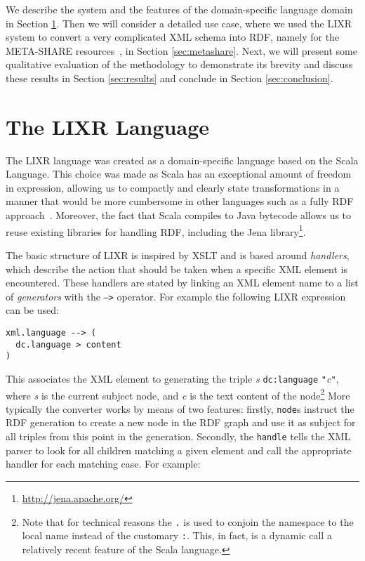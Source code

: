 \documentclass{acm_proc_article-sp}
\begin{document}
We describe the system and the features of the domain-specific language domain in Section
\ref{sec:dsl}. Then we will consider a detailed use case, where we used the LIXR
system to convert a very complicated XML schema into RDF, namely for the META-SHARE
resources~\cite{mccrae2015ontology,piperidis2012meta}, in Section \ref{sec:metashare}. Next, we will present some qualitative evaluation
of the methodology to demonstrate its brevity and discuss these results in Section
\ref{sec:results} and conclude in Section \ref{sec:conclusion}.

\section{The LIXR Language}
\label{sec:dsl}

The LIXR language was created as a domain-specific language based on the Scala
Language. This choice was made as Scala has an exceptional amount of freedom in
expression, allowing us to compactly and clearly state transformations in a manner
that would be more cumbersome in other languages such as a fully RDF approach~\cite{dimou2014rdf}. Moreover, the fact that Scala
compiles to Java bytecode allows us to reuse existing libraries for handling
RDF, including the Jena library\footnote{\url{http://jena.apache.org/}}.

The basic structure of LIXR is inspired by XSLT and is based around \emph{handlers},
which describe the action that should be taken when a specific XML element is 
encountered. These handlers are stated by linking an XML element name to a list
of \emph{generators} with the {\tt -->} operator. For example the following LIXR
expression can be used:

\begin{verbatim}
xml.language --> (
  dc.language > content
)
\end{verbatim}

This associates the XML element {\tt <xml:language>} to
generating the triple \emph{s} {\tt dc:language} {\tt "}\emph{c}{\tt "}, 
where \emph{s} is the current subject node, and \emph{c} is the text content of
the node\footnote{Note that for technical reasons the {\tt .} is used to conjoin the namespace
to the local name instead of the customary {\tt :}. This, in fact, is 
a dynamic call a relatively recent feature of the Scala language.} More typically
the converter works by means of two features: firstly, {\tt node}s instruct the RDF generation
to create a new node in the RDF graph and use it as subject for all triples
from this point in the generation. Secondly, the {\tt handle} tells the XML parser to look for all 
children matching a given element and call the appropriate handler for each matching
case. For example:
\end{document}
